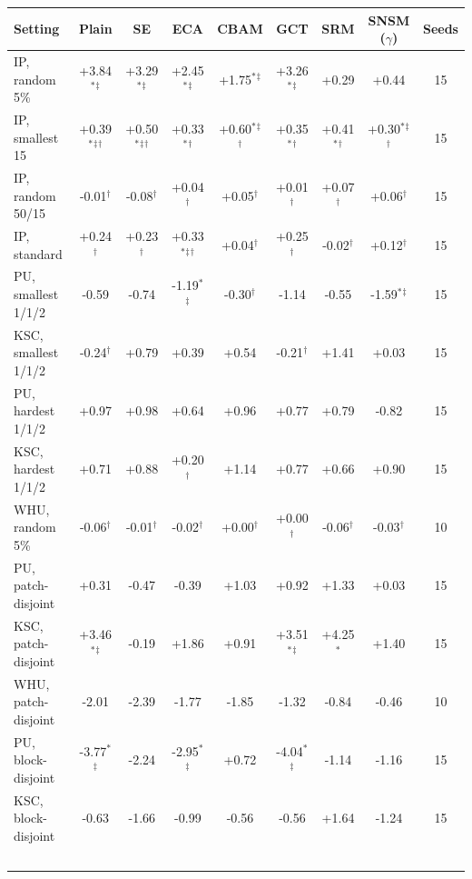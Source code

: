 \begin{tabular}{lcccccccc}
\toprule
Setting & Plain & SE & ECA & CBAM & GCT & SRM & SNSM ($\gamma$) & Seeds \\
\midrule
IP, random 5\% & +3.84$^{*}$$^{\ddagger}$ & +3.29$^{*}$$^{\ddagger}$ & +2.45$^{*}$$^{\ddagger}$ & +1.75$^{*}$$^{\ddagger}$ & +3.26$^{*}$$^{\ddagger}$ & +0.29 & +0.44 & 15 \\
IP, smallest 15 & +0.39$^{*}$$^{\ddagger}$$^{\dagger}$ & +0.50$^{*}$$^{\ddagger}$$^{\dagger}$ & +0.33$^{*}$$^{\dagger}$ & +0.60$^{*}$$^{\ddagger}$$^{\dagger}$ & +0.35$^{*}$$^{\dagger}$ & +0.41$^{*}$$^{\dagger}$ & +0.30$^{*}$$^{\ddagger}$$^{\dagger}$ & 15 \\
IP, random 50/15 & -0.01$^{\dagger}$ & -0.08$^{\dagger}$ & +0.04$^{\dagger}$ & +0.05$^{\dagger}$ & +0.01$^{\dagger}$ & +0.07$^{\dagger}$ & +0.06$^{\dagger}$ & 15 \\
IP, standard & +0.24$^{\dagger}$ & +0.23$^{\dagger}$ & +0.33$^{*}$$^{\ddagger}$$^{\dagger}$ & +0.04$^{\dagger}$ & +0.25$^{\dagger}$ & -0.02$^{\dagger}$ & +0.12$^{\dagger}$ & 15 \\
\midrule
PU, smallest 1/1/2 & -0.59 & -0.74 & -1.19$^{*}$$^{\ddagger}$ & -0.30$^{\dagger}$ & -1.14 & -0.55 & -1.59$^{*}$$^{\ddagger}$ & 15 \\
KSC, smallest 1/1/2 & -0.24$^{\dagger}$ & +0.79 & +0.39 & +0.54 & -0.21$^{\dagger}$ & +1.41 & +0.03 & 15 \\
PU, hardest 1/1/2 & +0.97 & +0.98 & +0.64 & +0.96 & +0.77 & +0.79 & -0.82 & 15 \\
KSC, hardest 1/1/2 & +0.71 & +0.88 & +0.20$^{\dagger}$ & +1.14 & +0.77 & +0.66 & +0.90 & 15 \\
\midrule
WHU, random 5\% & -0.06$^{\dagger}$ & -0.01$^{\dagger}$ & -0.02$^{\dagger}$ & +0.00$^{\dagger}$ & +0.00$^{\dagger}$ & -0.06$^{\dagger}$ & -0.03$^{\dagger}$ & 10 \\
PU, patch-disjoint & +0.31 & -0.47 & -0.39 & +1.03 & +0.92 & +1.33 & +0.03 & 15 \\
KSC, patch-disjoint & +3.46$^{*}$$^{\ddagger}$ & -0.19 & +1.86 & +0.91 & +3.51$^{*}$$^{\ddagger}$ & +4.25$^{*}$ & +1.40 & 15 \\
WHU, patch-disjoint & -2.01 & -2.39 & -1.77 & -1.85 & -1.32 & -0.84 & -0.46 & 10 \\
PU, block-disjoint & -3.77$^{*}$$^{\ddagger}$ & -2.24 & -2.95$^{*}$$^{\ddagger}$ & +0.72 & -4.04$^{*}$$^{\ddagger}$ & -1.14 & -1.16 & 15 \\
KSC, block-disjoint & -0.63 & -1.66 & -0.99 & -0.56 & -0.56 & +1.64 & -1.24 & 15 \\
$$
\end{tabular}
